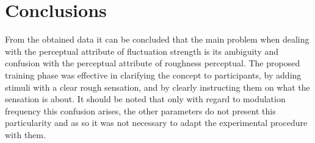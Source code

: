 \documentclass[../main.tex]{subfiles}
\begin{document}
\section{Conclusions}

From the obtained data it can be concluded that the main problem when dealing
with the perceptual attribute of fluctuation strength is its ambiguity and
confusion with the perceptual attribute of roughness perceptual. The proposed
training phase was effective in clarifying the concept to participants, by
adding stimuli with a clear rough sensation, and by clearly instructing them on
what the sensation is about. It should be noted that only with regard to
modulation frequency this confusion arises, the other parameters do not present
this particularity and as so it was not necessary to adapt the experimental
procedure with them.
\end{document}

